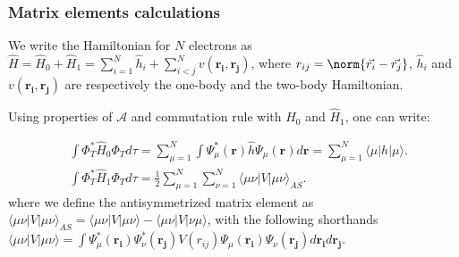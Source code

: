 \documentclass[xcolor=pdftex,hyperref={pdfpagelabels=false},table]{beamer}
\begin{document}
\begin{frame}
\frametitle{Matrix elements calculations}
\begin{scriptsize}
\begin{definition}
We write the Hamiltonian for $N$ electrons as $\hat{H}=\hat{H}_0+\hat{H}_1=\sum_{i=1}^{N}\hat{h}_i+ \sum_{i<j}^{N}v(\mathbf{r_i},\mathbf{r_j})$,
where $r_{ij}=\norm{\vec{r_i}-\vec{r_j}}$, $\hat{h}_i$ and $v(\mathbf{r_i},\mathbf{r_j})$  are respectively the one-body and the two-body Hamiltonian.
\end{definition}
Using properties of $\mathcal{A}$ and commutation rule with $\hat{H}_0$ and $\hat{H}_1$, one can write:

\begin{align}
&\int \Phi_T^* \hat{H}_0 \Phi_T d\tau = \sum_{\mu=1}^N  \int \Psi_\mu^*(\mathbf{r}) \hat{h} \Psi_\mu(\mathbf{r}) d\mathbf{r} = \sum_{\mu=1}^N \langle \mu |h| \mu \rangle.\\
&\int \Phi_T^*\hat{H}_1 \Phi_T d\tau = \frac{1}{2}  \sum_{\mu=1}^N \sum_{\nu=1}^N \langle \mu \nu |V| \mu \nu \rangle_{AS}.
\end{align}
where we define the antisymmetrized matrix element as $\langle \mu \nu |V| \mu \nu \rangle_{AS} = \langle \mu \nu |V| \mu \nu \rangle - \langle \mu \nu |V| \nu \mu \rangle$, with the following shorthands $\langle \mu \nu |V| \mu \nu \rangle = \int \Psi_\mu^*(\mathbf{r_i}) \Psi_\nu^*(\mathbf{r_j}) V(r_{ij}) \Psi_\mu(\mathbf{r_i}) \Psi_\nu(\mathbf{r_j}) d\mathbf{r_i} d\mathbf{r_j}$.
\end{scriptsize}
\end{frame}
\end{document}
